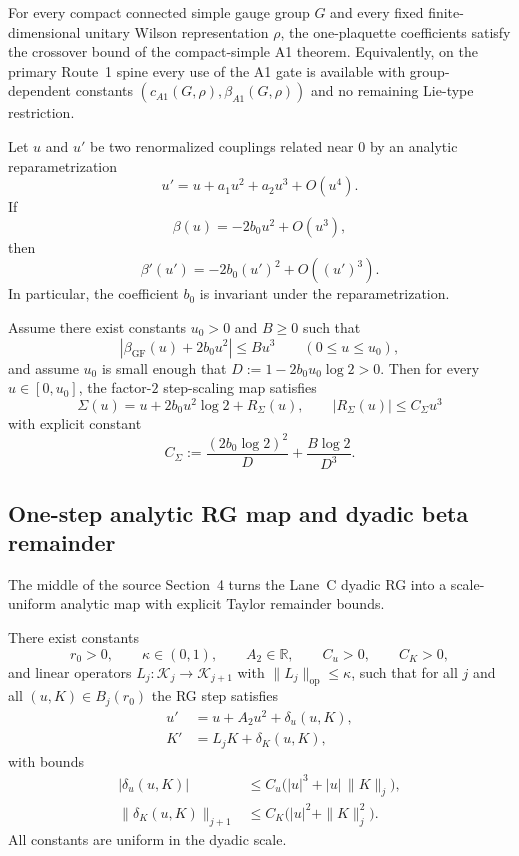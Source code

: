 \documentclass[preprint,aip,jmp,amsmath,amssymb,nofootinbib]{revtex4-2}
\begin{document}
\begin{theorem}
For every compact connected simple gauge group $G$ and every fixed finite-dimensional unitary Wilson representation $\rho$, the one-plaquette coefficients satisfy the crossover bound of the compact-simple A1 theorem. Equivalently, on the primary Route~1 spine every use of the A1 gate is available with group-dependent constants $(c_{A1}(G,\rho),\beta_{A1}(G,\rho))$ and no remaining Lie-type restriction.
\end{theorem}

\begin{proposition}
Let $u$ and $u'$ be two renormalized couplings related near $0$ by an analytic reparametrization
\[
u' = u + a_1 u^2 + a_2 u^3 + O(u^4).
\]
If
\[
\beta(u) = -2b_0u^2 + O(u^3),
\]
then
\[
\beta'(u') = -2b_0 (u')^2 + O((u')^3).
\]
In particular, the coefficient $b_0$ is invariant under the reparametrization.
\end{proposition}

\begin{lemma}
Assume there exist constants $u_0>0$ and $B\ge 0$ such that
\[
|\beta_{\mathrm{GF}}(u)+2b_0u^2| \le B u^3
\qquad (0\le u\le u_0),
\]
and assume $u_0$ is small enough that $D:=1-2b_0u_0\log 2>0$. Then for every $u\in[0,u_0]$, the factor-$2$ step-scaling map satisfies
\[
\Sigma(u)=u+2b_0u^2\log 2 + R_\Sigma(u),
\qquad
|R_\Sigma(u)|\le C_\Sigma u^3
\]
with explicit constant
\[
C_\Sigma:= \frac{(2b_0\log 2)^2}{D} + \frac{B\log 2}{D^3}.
\]
\end{lemma}

\subsection{One-step analytic RG map and dyadic beta remainder}
The middle of the source Section~4 turns the Lane~C dyadic RG into a scale-uniform analytic map with explicit Taylor remainder bounds.

\begin{proposition}
There exist constants
\[
r_0>0,\qquad \kappa\in(0,1),\qquad A_2\in\mathbb R,\qquad C_u>0,\qquad C_K>0,
\]
and linear operators $L_j:\mathcal K_j\to \mathcal K_{j+1}$ with $\|L_j\|_{\mathrm{op}}\le \kappa$, such that for all $j$ and all $(u,K)\in B_j(r_0)$ the RG step satisfies
\begin{align}
u' &= u + A_2 u^2 + \delta_u(u,K),\\
K' &= L_j K + \delta_K(u,K),
\end{align}
with bounds
\begin{align}
|\delta_u(u,K)| &\le C_u \bigl(|u|^3 + |u|\,\|K\|_j\bigr),\\
\|\delta_K(u,K)\|_{j+1} &\le C_K \bigl(|u|^2 + \|K\|_j^2\bigr).
\end{align}
All constants are uniform in the dyadic scale.
\end{proposition}
\end{document}
